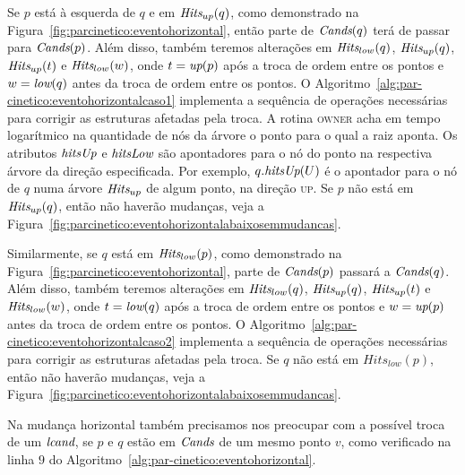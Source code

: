 

Se $p$ está à esquerda de $q$ e em $\textit{Hits}_{up}(q)$, como demonstrado na
Figura~\ref{fig:parcinetico:eventohorizontal}, então parte de $\textit{Cands}(q)$ terá de passar
para $\textit{Cands}(p)$.
Além disso, também teremos alterações em $\textit{Hits}_{low}(q)$, $\textit{Hits}_{up}(q)$, $\textit{Hits}_{up}(t)$ e
$\textit{Hits}_{low}(w)$, onde $t = \textit{up}(p)$ após a troca de ordem entre os pontos e $w = \textit{low}(q)$ antes da
troca de ordem entre os pontos.
O Algoritmo~\ref{alg:par-cinetico:eventohorizontalcaso1} implementa a sequência de operações
necessárias para corrigir as estruturas afetadas pela troca.
A rotina \textsc{owner} acha em tempo logarítmico na quantidade de nós da árvore o ponto para o
qual a raiz aponta.
Os atributos $\textit{hitsUp}$ e $\textit{hitsLow}$ são apontadores para o nó do ponto na respectiva árvore da
direção especificada.
Por exemplo, $q.\textit{hitsUp}(U)$ é o apontador para o nó de $q$ numa árvore $\textit{Hits}_{up}$ de algum
ponto, na direção \textsc{up}.
Se $p$ não está em $\textit{Hits}_{up}(q)$, então não haverão mudanças, veja a
Figura~\ref{fig:parcinetico:eventohorizontalabaixosemmudancas}.

Similarmente, se $q$ está em $\textit{Hits}_{low}(p)$, como demonstrado na
Figura~\ref{fig:parcinetico:eventohorizontal}, parte de $\textit{Cands}(p)$ passará a $\textit{Cands}(q)$.
Além disso, também teremos alterações em $\textit{Hits}_{low}(q)$, $\textit{Hits}_{up}(q)$, $\textit{Hits}_{up}(t)$ e
$\textit{Hits}_{low}(w)$, onde $t = \textit{low}(q)$ após a troca de ordem entre os pontos e $w = \textit{up}(p)$ antes da
troca de ordem entre os pontos.
O Algoritmo~\ref{alg:par-cinetico:eventohorizontalcaso2} implementa a sequência de operações
necessárias para corrigir as estruturas afetadas pela troca.
Se $q$ não está em $Hits_{low}(p)$, então não haverão mudanças, veja a
Figura~\ref{fig:parcinetico:eventohorizontalabaixosemmudancas}.







Na mudança horizontal também precisamos nos preocupar com a possível troca de um
$\textit{lcand}$, se $p$ e $q$ estão em $\textit{Cands}$ de um mesmo ponto $v$, como verificado na linha $9$ do
Algoritmo~\ref{alg:par-cinetico:eventohorizontal}.



